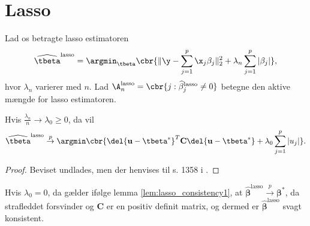 \section{Lasso}
Lad os betragte lasso estimatoren
\begin{align*}
\widehat{\tbeta}^\text{lasso} = \argmin_{\tbeta} \cbr{ \Vert \y - \sum_{j=1}^p \x_j \beta_j \Vert_2^2 + \lambda_n \sum_{j=1}^p \vert \beta_j \vert},
\end{align*}
hvor \(\lambda_n\) varierer med \(n\).
Lad \(\A_n^\text{lasso} = \cbr{j : \widehat{\beta}_j^\text{lasso} \neq 0}\) betegne den aktive mængde for lasso estimatoren.

\begin{lem}\label{lem:lasso_consistency1}
Hvis $\frac{\lambda_n}{n} \rightarrow \lambda_0 \geq 0$, da vil
\begin{align*}
\widehat{\tbeta}^\text{lasso} \overset{p}{\rightarrow} \argmin \cbr{ \del{\mathbf{u} - \tbeta^*}^T \mathbf{C} \del{\mathbf{u} - \tbeta^*} + \lambda_0 \sum_{j=1}^p \vert u_j \vert}.
\end{align*}
\end{lem}
\begin{proof}
Beviset undlades, men der henvises til s. 1358 i \citep{adaptive_lasso_knight}.
\end{proof}
Hvis $\lambda_0=0$, da gælder ifølge lemma \ref{lem:lasso_consistency1}, at $\widehat{\boldsymbol{\beta}}^\text{lasso} \overset{p}{\rightarrow} \boldsymbol{\beta}^{*}$, da strafleddet forsvinder og $\mathbf{C}$ er en positiv definit matrix, og dermed er $\widehat{\boldsymbol{\beta}}^\text{lasso}$ svagt konsistent. 

